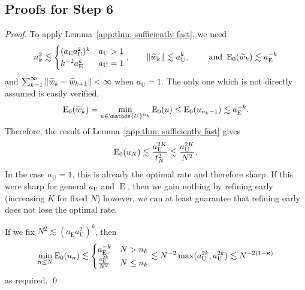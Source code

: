 \documentclass[smallextended]{svjour3}
\let\F\mathds\let\C\mathcal\newcommand{\R}{\F{R}}\newcommand{\A}{\tens{A}}
\newcommand{\norm}[1]{{\left\lVert #1 \right\rVert}}
\newcommand{\op}[1]{\operatorname{#1}}
\newcommand{\splitln}[4]{\begin{cases} #1 & #2 \\ #3 & #4\end{cases}}
\newcommand{\1}{\F{1}}
\newcommand{\aU}{a_{\op{U}}}\newcommand{\aE}{a_{\op{E}}}
\newcommand*{\var}[1]{%
	\IfEqCase{#1}{%
		{0}{u}%
		{1}{v}%
		{2}{w}%
	}[u#1]%
}
\begin{document}
	
	\subsection{Proofs for Step 6}
	\begin{theorem}\label{app:thm: stronger exponential FISTA convergence}
	\end{theorem}
	\begin{proof}
		To apply Lemma~\ref{app:thm: sufficiently fast}, we need
		\begin{equation}
			n_k^2\lesssim \splitln{(\aE\aU^2)^k}{\aU>1}{k^{-2}\aE^k}{\aU=1}, \qquad \norm{\tilde{\var2}_k}\lesssim \aU^{k}, \qquad \text{ and } \op{E}_0(\tilde{\var2}_k)\lesssim \aE^{-k}
		\end{equation}
		and $\sum_{k=1}^\infty\norm{\tilde{\var2}_k-\tilde{\var2}_{k+1}}<\infty$ when $\aU=1$. The only one which is not directly assumed is easily verified,
		\begin{equation}
			\op{E}_0(\tilde{\var2}_k) = \min_{\var0\in\F{U}^{n_k}}\op{E}_0(\var0) \leq\op{E}_0(\var0_{n_k-1}) \lesssim \aE^{-k}.
		\end{equation}
		Therefore, the result of Lemma~\ref{app:thm: sufficiently fast} gives
		\begin{equation}
			\op{E}_0(\var0_N) \lesssim \frac{\aU^{2K}}{t_N^2} \lesssim \frac{\aU^{2K}}{N^2}.
		\end{equation}
		In the case $\aU=1$, this is already the optimal rate and therefore sharp. If this were sharp for general $\aU$ and $\op{E}$, then we gain nothing by refining early (increasing $K$ for fixed $N$) however, we can at least guarantee that refining early does not lose the optimal rate.
		
		If we fix $N^2\lesssim (\aE\aU^2)^k$, then
		\begin{equation}
			\min_{n\leq N} \op{E}_0(\var0_n)\lesssim \splitln{\aE^{-k}}{N>n_k}{ \frac{\aU^{2k}}{N^2}}{N\leq n_k} \lesssim N^{-2}\max(\aU^{2k},\aU^{2k}) \lesssim N^{-2(1-\kappa)}
		\end{equation}
		as required.
		\qed\end{proof}
	
	
	
\end{document}
